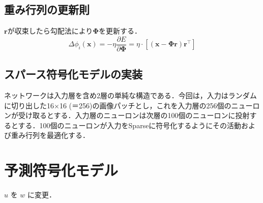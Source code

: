 \subsection{重み行列の更新則}
$\mathbf{r}$が収束したら勾配法により$\mathbf{\Phi}$を更新する．
\begin{equation}
\Delta \phi_i(\boldsymbol{x}) = -\eta \frac{\partial E}{\partial \mathbf{\Phi}}=\eta\cdot\left[\left(\mathbf{x}-\mathbf{\Phi}\mathbf{r}\right)\mathbf{r}^\top\right]
\end{equation}
\subsection{スパース符号化モデルの実装}
ネットワークは入力層を含め2層の単純な構造である．今回は，入力はランダムに切り出した16×16 (＝256)の画像パッチとし，これを入力層の256個のニューロンが受け取るとする．入力層のニューロンは次層の100個のニューロンに投射するとする．100個のニューロンが入力をSparseに符号化するようにその活動および重み行列を最適化する．
\section{予測符号化モデル}
$u$ を $w$ に変更．
